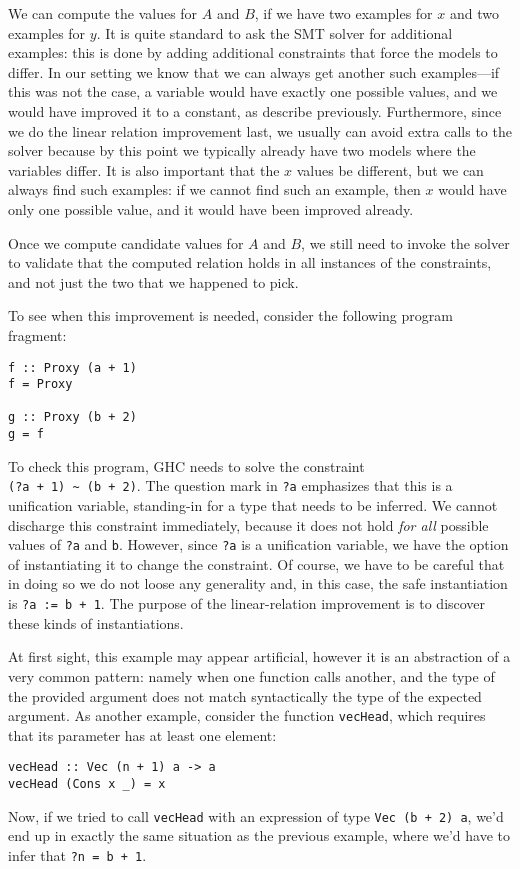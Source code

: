 \documentclass{sigplanconf}
\begin{document}
We can compute the values for $A$ and $B$, if we have two examples for
$x$ and two examples for $y$.  It is quite standard to ask the SMT
solver for additional examples: this is done by adding additional constraints
that force the models to differ.  In our setting we know that we can
always get another such examples---if this was not the case, a variable
would have exactly one possible values, and we would have improved
it to a constant, as describe previously.  Furthermore, since we do the linear
relation improvement last, we usually can avoid extra calls to the solver
because by this point we typically already have two models where
the variables differ.  It is also
important that the $x$ values be different, but we can always find such
examples: if we cannot find such an example, then $x$ would have only
one possible value, and it would have been improved already.

Once we compute candidate values for $A$ and $B$, we still need to
invoke the solver to validate that the computed relation holds in all
instances of the constraints, and not just the two that we happened to pick.

\break
To see when this improvement is needed, consider the following program
fragment:
\begin{Verbatim}
f :: Proxy (a + 1)
f = Proxy

g :: Proxy (b + 2)
g = f
\end{Verbatim}
To check this program, GHC needs to solve the constraint \\
\Verb"(?a + 1) ~ (b + 2)". The question mark in \Verb"?a" emphasizes that
this is a unification variable, standing-in for a type that needs to be
inferred. We cannot discharge this constraint immediately, because it
does not hold {\em for all} possible values of \Verb"?a" and \Verb"b".
However, since \Verb"?a" is a unification variable, we have the option
of instantiating it to change the constraint.  Of course, we have to
be careful that in doing so we do not loose any generality and, in this
case, the safe instantiation is \Verb"?a := b + 1".  The purpose of the
linear-relation improvement is to discover these kinds of
instantiations.

At first sight, this example may appear artificial, however it is an
abstraction of a very common pattern: namely when one function calls
another, and the type of the provided argument does not match
syntactically the type of the expected argument.  As another example,
consider the function \Verb"vecHead", which requires that its parameter
has at least one element:
\begin{Verbatim}
vecHead :: Vec (n + 1) a -> a
vecHead (Cons x _) = x
\end{Verbatim}
Now, if we tried to call \Verb"vecHead" with an expression of type
\Verb"Vec (b + 2) a", we'd end up in exactly the same situation as the
previous example, where we'd have to infer that \Verb"?n = b + 1".
\end{document}
